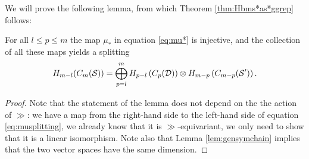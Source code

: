 We will prove the following lemma, from which Theorem \ref{thm:Hbms*as*ggrep} follows:
\begin{lem}
 \label{lem:oplussplitting}
For all $l\leq p\leq m$ the map $\mu_*$ in equation \eqref{eq:mu*} is injective, and the collection
of all these maps yields a splitting
\begin{equation}
  \label{eq:musplitting}
 H_{m-l}(C_m(\mathcal{S}))=\bigoplus_{p=l}^m H_{p-l}\left(C_p(\mathcal{D})\right)\otimes H_{m-p}\left(C_{m-p}(\mathcal{S}')\right).
\end{equation}
\end{lem}
\begin{proof}
Note that the statement of the lemma does not depend on the the action of $\gg$:
we have a map from the right-hand side to the left-hand side of equation \eqref{eq:musplitting},
we already know that it is $\gg$-equivariant,
we only need to show that it is a linear isomorphism. Note also that Lemma \ref{lem:gensymchain}
implies that the two vector spaces have the same dimension.
% 
% 
% 


\end{proof}
